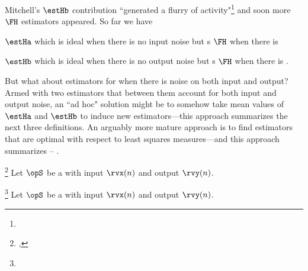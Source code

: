 Mitchell's $\estHb$ contribution ``generated a flurry of activity"\footnote{}
and soon more $\FH$ estimators appeared.
So far we have
\begin{listi}
  \item $\estHa$ which is ideal when there is no input noise but
        s $\FH$ when there is 
  \item $\estHb$ which is ideal when there is no output noise but
        s $\FH$ when there is .
\end{listi}
But what about estimators for when there is noise on both input and output?
Armed with two estimators that between them account for both input and output noise,
an ``ad hoc" solution might be to somehow take mean values of $\estHa$ and $\estHb$
to induce new estimators---this approach summarizes the next three definitions.
An arguably more mature approach is to find estimators that are optimal with respect to least squares measures---and
this approach summarizes  -- .

\begin{definition}
\footnote{
  ,
  }
\label{def:Havg}
Let $\opS$ be a  with input $\rvx(n)$ and output $\rvy(n)$.
\end{definition}

\begin{definition}
\footnote{
  }
\label{def:Hgm}
Let $\opS$ be a  with input $\rvx(n)$ and output $\rvy(n)$.
\end{definition}

